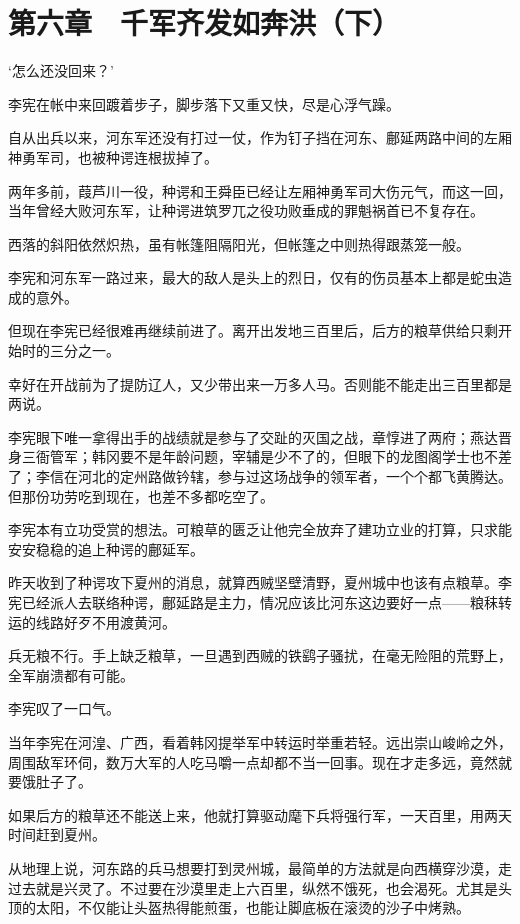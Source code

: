\section{第六章　千军齐发如奔洪（下）}

‘怎么还没回来？’

李宪在帐中来回踱着步子，脚步落下又重又快，尽是心浮气躁。

自从出兵以来，河东军还没有打过一仗，作为钉子挡在河东、鄜延两路中间的左厢神勇军司，也被种谔连根拔掉了。

两年多前，葭芦川一役，种谔和王舜臣已经让左厢神勇军司大伤元气，而这一回，当年曾经大败河东军，让种谔进筑罗兀之役功败垂成的罪魁祸首已不复存在。

西落的斜阳依然炽热，虽有帐篷阻隔阳光，但帐篷之中则热得跟蒸笼一般。

李宪和河东军一路过来，最大的敌人是头上的烈日，仅有的伤员基本上都是蛇虫造成的意外。

但现在李宪已经很难再继续前进了。离开出发地三百里后，后方的粮草供给只剩开始时的三分之一。

幸好在开战前为了提防辽人，又少带出来一万多人马。否则能不能走出三百里都是两说。

李宪眼下唯一拿得出手的战绩就是参与了交趾的灭国之战，章惇进了两府；燕达晋身三衙管军；韩冈要不是年龄问题，宰辅是少不了的，但眼下的龙图阁学士也不差了；李信在河北的定州路做钤辖，参与过这场战争的领军者，一个个都飞黄腾达。但那份功劳吃到现在，也差不多都吃空了。

李宪本有立功受赏的想法。可粮草的匮乏让他完全放弃了建功立业的打算，只求能安安稳稳的追上种谔的鄜延军。

昨天收到了种谔攻下夏州的消息，就算西贼坚壁清野，夏州城中也该有点粮草。李宪已经派人去联络种谔，鄜延路是主力，情况应该比河东这边要好一点——粮秣转运的线路好歹不用渡黄河。

兵无粮不行。手上缺乏粮草，一旦遇到西贼的铁鹞子骚扰，在毫无险阻的荒野上，全军崩溃都有可能。

李宪叹了一口气。

当年李宪在河湟、广西，看着韩冈提举军中转运时举重若轻。远出崇山峻岭之外，周围敌军环伺，数万大军的人吃马嚼一点却都不当一回事。现在才走多远，竟然就要饿肚子了。

如果后方的粮草还不能送上来，他就打算驱动麾下兵将强行军，一天百里，用两天时间赶到夏州。

从地理上说，河东路的兵马想要打到灵州城，最简单的方法就是向西横穿沙漠，走过去就是兴灵了。不过要在沙漠里走上六百里，纵然不饿死，也会渴死。尤其是头顶的太阳，不仅能让头盔热得能煎蛋，也能让脚底板在滚烫的沙子中烤熟。

